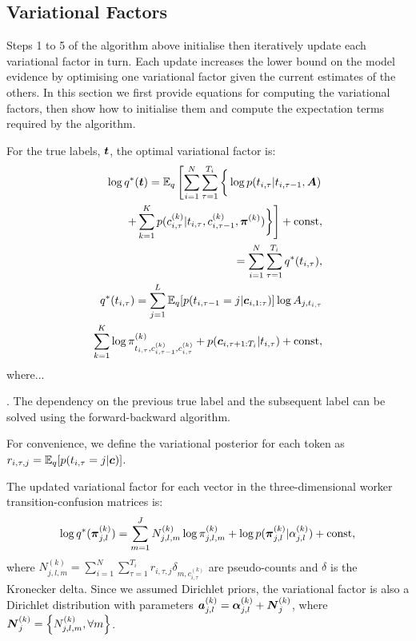 \subsection{Variational Factors}

Steps 1 to 5 of the algorithm above initialise then iteratively update each variational factor in turn. Each update increases the lower bound on the model evidence by optimising one variational factor given the current estimates of the others. In this section we first provide equations for computing the variational factors, then show how to initialise them and compute the expectation terms required by the algorithm.

For the true labels, $\boldsymbol t$, the optimal variational factor is:
\begin{align}
  \log q^*(\boldsymbol t) = \mathbb{E}_{q} \left[ \sum_{i=1}^N \sum_{\tau=1}^{T_i} \bigg\{ \log p(t_{i,\tau} | t_{i,\tau-1}, \boldsymbol A ) \right. \nonumber \\
  \left. + \sum_{k=1}^K p(c_{i,\tau}^{(k)} | t_{i,\tau}, c_{i,\tau-1}^{(k)}, \boldsymbol\pi^{(k)})
  \bigg\} \right] + \mathrm{const}, \nonumber\\
   \label{eq:qstar_t}
   =  \sum_{i=1}^N \sum_{\tau=1}^{T_i} q^*(t_{i,\tau}), \\
 q^*(t_{i,\tau}) = \sum_{j=1}^L \mathbb{E}_q[p(t_{i,\tau-1}=j | \boldsymbol c_{i,1:\tau})] 
 \log A_{j,t_{i,\tau}} \nonumber\\ 
   \sum_{k=1}^K \log\pi^{(k)}_{t_{i,\tau},c^{(k)}_{i,\tau-1},c^{(k)}_{i,\tau}}
   +  p(\boldsymbol c_{i,\tau+1:T_i} | t_{i,\tau}) + \mathrm{const}, \nonumber\\
\end{align}
where...

. The dependency on the previous true label and the subsequent label can be solved using the forward-backward algorithm.  

For convenience, we define the variational posterior for each token as $r_{i,\tau,j} = \mathbb{E}_q[p(t_{i,\tau}=j | \boldsymbol c)]$.

The updated variational factor for each vector in the three-dimensional worker transition-confusion matrices is:
\begin{align}
  \log q^*(\boldsymbol\pi_{j,l}^{(k)}) = \sum_{m=1}^J N_{j,l,m}^{(k)}\log\pi_{j,l,m}^{(k)} + \log p(\boldsymbol\pi_{j,l}^{(k)} | \alpha_{j,l}^{(k)}) + \mathrm{const},
\end{align}
where $N^{(k)}_{j,l,m} = \sum_{i=1}^N\sum_{\tau=1}^{T_i} r_{i,\tau,j} \delta_{m,c^{(k)}_{i,\tau}}$ are
pseudo-counts and $\delta$ is the Kronecker delta. Since we assumed Dirichlet priors, the variational 
factor is also a Dirichlet distribution with parameters $\boldsymbol a_{j,l}^{(k)} = \boldsymbol\alpha_{j,l}^{(k)} + \boldsymbol N_{j}^{(k)}$, where $\boldsymbol N_j^{(k)}=\left\{ N_{j,l,m}^{(k)}, \forall m \right\}$. 

